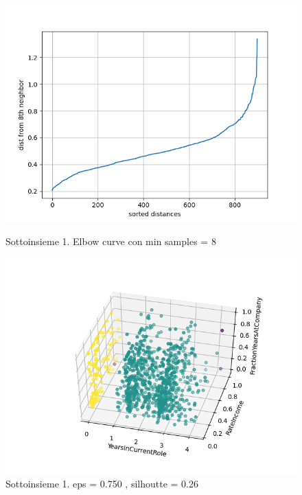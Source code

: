 \documentclass[a4paper,9pt]{article}
\begin{document}
\begin{figure}[H]
\begin{minipage}[b]{0.45\textwidth}
\centering
\includegraphics[width=\textwidth]{Figure_1.png}
\caption{Sottoinsieme 1. Elbow curve con min samples =  8 }
\label{etichetta1}
\end{minipage}
\hfill
\begin{minipage}[b]{0.45\textwidth}
\centering
\includegraphics[width=\textwidth]{Figure_24.png}
\caption{Sottoinsieme 1. eps = 0.750 , silhoutte = 0.26 }
\label{etichetta2}
\end{minipage}
\end{figure}
\end{document}
